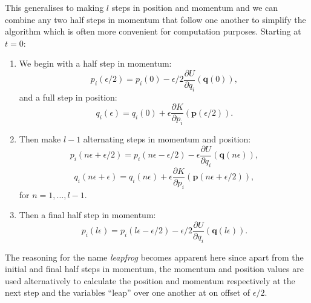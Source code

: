 \documentclass[12pt]{article}
\begin{document}
            This generalises to making $l$ steps in position and momentum and we can combine any two half steps in momentum that follow one another to simplify the algorithm which is often more convenient for computation purposes. Starting at $t=0$:
            \begin{enumerate}
                \item We begin with a half step in momentum:
                \begin{equation}
                    \label{eq:MomentumInitialHalfStep}
                    p_i\left(\epsilon/2\right) = p_i\left(0\right) - \epsilon/2\frac{\partial U}{\partial q_i}\left(\bm{q}\left(0\right)\right),
                \end{equation}
                and a full step in position:
                \begin{equation}
                    \label{eq:PositionInitialStep}
                    q_i\left(\epsilon\right) = q_i\left(0\right) + \epsilon\frac{\partial K}{\partial p_i}\left(\bm{p}\left(\epsilon/2\right)\right).
                \end{equation}
                \item Then make $l-1$ alternating steps in momentum and position:
                \begin{equation}
                    \label{eq:MomentumFullStep}
                    p_i\left(n\epsilon+\epsilon/2\right) = p_i\left(n\epsilon-\epsilon/2\right) - \epsilon\frac{\partial U}{\partial q_i}\left(\bm{q}\left(n\epsilon\right)\right),
                \end{equation}
                \begin{equation}
                    \label{eq:PositionFullStep}
                    q_i\left(n\epsilon+\epsilon\right) = q_i\left(n\epsilon\right) + \epsilon\frac{\partial K}{\partial p_i}\left(\bm{p}\left(n\epsilon+\epsilon/2\right)\right),
                \end{equation}
                for $n = 1, \dots , l-1$.
                \item Then a final half step in momentum:
                \begin{equation}
                    \label{eq:Momnetum}
                    p_i\left(l\epsilon\right) = p_i\left(l\epsilon-\epsilon/2\right) - \epsilon/2\frac{\partial U}{\partial q_i}\left(\bm{q}\left(l\epsilon\right)\right).
                \end{equation}
            \end{enumerate}
            The reasoning for the name \textit{leapfrog} becomes apparent here since apart from the initial and final half steps in momentum, the momentum and position values are used alternatively to calculate the position and momentum respectively at the next step and the variables ``leap'' over one another at on offset of $\epsilon/2$. 
\end{document}
